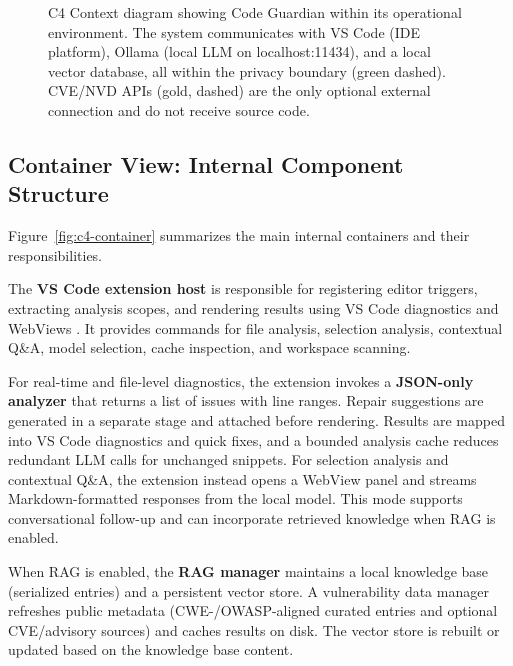 \begin{figure}
  \centering
  \caption[C4 Context diagram for Code Guardian.]{C4 Context diagram showing Code Guardian within its operational environment. The system communicates with VS Code (IDE platform), Ollama (local LLM on localhost:11434), and a local vector database, all within the privacy boundary (green dashed). CVE/NVD APIs (gold, dashed) are the only optional external connection and do not receive source code.}
  \label{fig:c4-context}
\end{figure}

\FloatBarrier

\subsection{Container View: Internal Component Structure}
\label{subsec:container-view}

Figure~\ref{fig:c4-container} summarizes the main internal containers and their responsibilities.

The \textbf{VS Code extension host} is responsible for registering editor triggers, extracting analysis scopes, and rendering results using VS Code diagnostics and WebViews \cite{vscodeExtensionApi}. It provides commands for file analysis, selection analysis, contextual Q\&A, model selection, cache inspection, and workspace scanning.

For real-time and file-level diagnostics, the extension invokes a \textbf{JSON-only analyzer} that returns a list of issues with line ranges. Repair suggestions are generated in a separate stage and attached before rendering. Results are mapped into VS Code diagnostics and quick fixes, and a bounded analysis cache reduces redundant LLM calls for unchanged snippets. For selection analysis and contextual Q\&A, the extension instead opens a WebView panel and streams Markdown-formatted responses from the local model. This mode supports conversational follow-up and can incorporate retrieved knowledge when RAG is enabled.

When RAG is enabled, the \textbf{RAG manager} maintains a local knowledge base (serialized entries) and a persistent vector store. A vulnerability data manager refreshes public metadata (CWE-/OWASP-aligned curated entries and optional CVE/advisory sources) and caches results on disk. The vector store is rebuilt or updated based on the knowledge base content.

